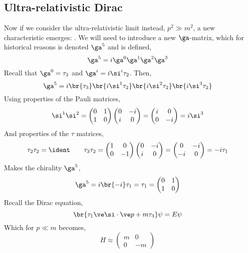 \documentclass{article}
\begin{document}
\subsection{Ultra-relativistic Dirac}
Now if we consider the ultra-relativistic limit instead, $p^2 \gg m^2$, a new characteristic emerges: . We will need to introduce a new $\ga$-matrix, which for historical reasons is denoted $\ga^{5}$ and is defined,
\[ \ga^{5} = i \ga^{0}\ga^{1}\ga^{2}\ga^{3} \]
Recall that $\ga^{0} = \tau_3$ and $\ga^{i} = i \si^{i} \tau_2$. Then,
\[ \ga^{5} = i \br{\tau_3}\br{i \si^{1} \tau_2}\br{i \si^{2} \tau_2}\br{i \si^{3} \tau_2} \]
Using properties of the Pauli matrices,
\[ \si^{1} \si^{2} = \begin{pmatrix} 0 & 1 \\ 1 & 0 \end{pmatrix}\begin{pmatrix} 0 & -i \\ i & 0 \end{pmatrix} = \begin{pmatrix} i & 0 \\ 0 & -i \end{pmatrix} = i \si^{3} \]
And properties of the $\tau$ matrices,
\[ \tau_{2} \tau_{2} = \ident\qquad \tau_{3} \tau_{2} = \begin{pmatrix} 1 & 0 \\ 0 & -1 \end{pmatrix}\begin{pmatrix} 0 & -i \\ i & 0 \end{pmatrix} = \begin{pmatrix} 0 & -i \\ -i & 0 \end{pmatrix} = -i \tau_{1}  \]
Makes the chirality $\ga^{5}$,
\[ \ga^{5} = i \br{-i} \tau_1 = \tau_1 = \begin{pmatrix} 0 & 1 \\ 1 & 0 \end{pmatrix} \]
Recall the Dirac equation,
\[ \br{\tau_1 \ve \si \cdot \ve p + m \tau_3} \psi = E \psi \]
Which for $p \ll m$ becomes,
\[ H \approx \begin{pmatrix}
    m & 0 \\ 0 & - m
\end{pmatrix} \]
\end{document}
